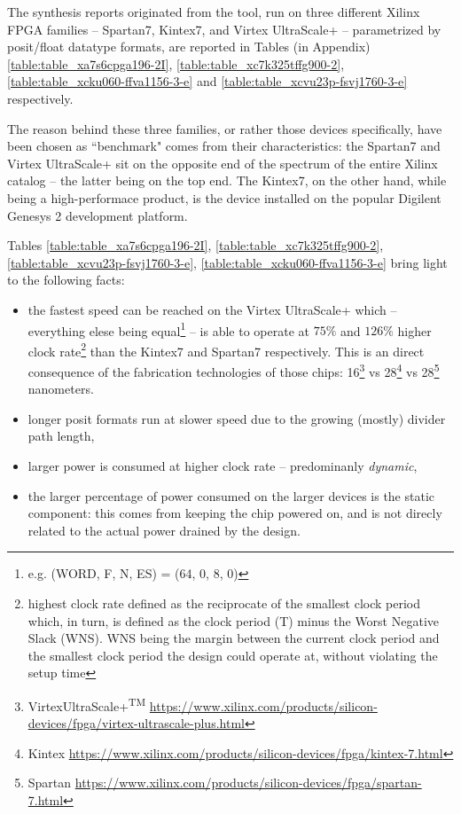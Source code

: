The synthesis reports originated from the tool, run on three different Xilinx FPGA families -- Spartan7, Kintex7, and Virtex UltraScale+ -- parametrized by posit/float datatype formats, are reported in Tables (in Appendix) \ref{table:table_xa7s6cpga196-2I}, \ref{table:table_xc7k325tffg900-2}, \ref{table:table_xcku060-ffva1156-3-e} and \ref{table:table_xcvu23p-fsvj1760-3-e} respectively.


The reason behind these three families, or rather those devices specifically, have been chosen as ``benchmark" comes from their characteristics: the Spartan7 and Virtex UltraScale+ sit on the opposite end of the spectrum of the entire Xilinx catalog -- the latter being on the top end. The Kintex7, on the other hand, while being a high-performace product, is the device installed on the popular Digilent Genesys 2 development platform.


Tables \ref{table:table_xa7s6cpga196-2I}, \ref{table:table_xc7k325tffg900-2}, \ref{table:table_xcvu23p-fsvj1760-3-e}, \ref{table:table_xcku060-ffva1156-3-e} bring light to the following facts:
\begin{itemize}
    \item the fastest speed can be reached on the Virtex UltraScale+ which -- everything elese being equal\footnote{e.g. (WORD, F, N, ES) = (64, 0, 8, 0)} -- is able to operate at $75 \%$ and $126 \%$ higher clock rate\footnote{highest clock rate defined as the reciprocate of the smallest clock period which, in turn, is defined as the clock period (T) minus the Worst Negative Slack (WNS). WNS being the margin between the current clock period and the smallest clock period the design could operate at, without violating the setup time} than the Kintex7 and Spartan7 respectively. This is an direct consequence of the fabrication technologies of those chips: 16\footnote{Virtex\textregistered UltraScale+\textsuperscript{TM} \url{https://www.xilinx.com/products/silicon-devices/fpga/virtex-ultrascale-plus.html}} vs 28\footnote{Kintex \url{https://www.xilinx.com/products/silicon-devices/fpga/kintex-7.html}} vs 28\footnote{Spartan \url{https://www.xilinx.com/products/silicon-devices/fpga/spartan-7.html}} nanometers.
    \item longer posit formats run at slower speed due to the growing (mostly) divider path length,
    \item larger power is consumed at higher clock rate -- predominanly \textit{dynamic},
    \item the larger percentage of power consumed on the larger devices is the static component: this comes from keeping the chip powered on, and is not direcly related to the actual power drained by the design.
\end{itemize}



